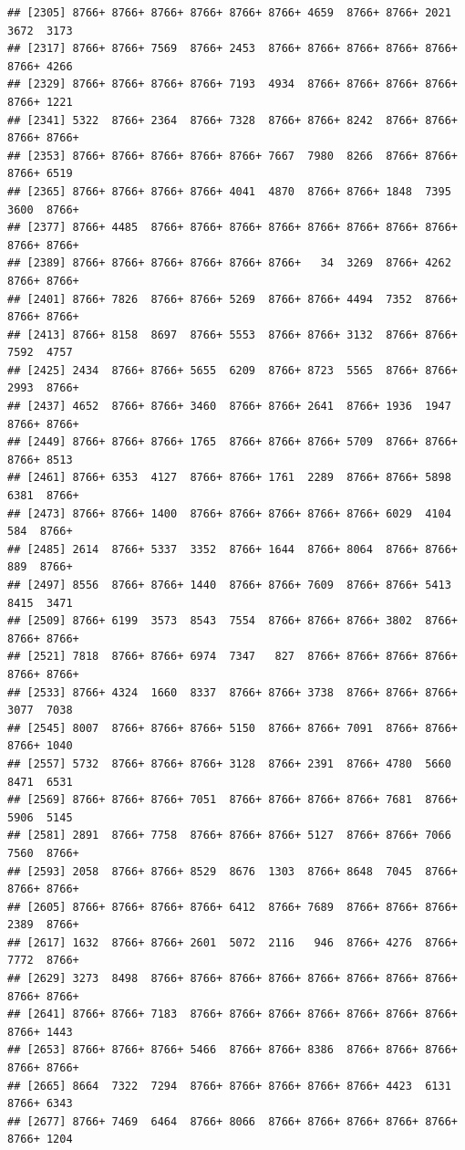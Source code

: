 \documentclass[
]{book}
\begin{document}
\begin{verbatim}
## [2305] 8766+ 8766+ 8766+ 8766+ 8766+ 8766+ 4659  8766+ 8766+ 2021  3672  3173 
## [2317] 8766+ 8766+ 7569  8766+ 2453  8766+ 8766+ 8766+ 8766+ 8766+ 8766+ 4266 
## [2329] 8766+ 8766+ 8766+ 8766+ 7193  4934  8766+ 8766+ 8766+ 8766+ 8766+ 1221 
## [2341] 5322  8766+ 2364  8766+ 7328  8766+ 8766+ 8242  8766+ 8766+ 8766+ 8766+
## [2353] 8766+ 8766+ 8766+ 8766+ 8766+ 7667  7980  8266  8766+ 8766+ 8766+ 6519 
## [2365] 8766+ 8766+ 8766+ 8766+ 4041  4870  8766+ 8766+ 1848  7395  3600  8766+
## [2377] 8766+ 4485  8766+ 8766+ 8766+ 8766+ 8766+ 8766+ 8766+ 8766+ 8766+ 8766+
## [2389] 8766+ 8766+ 8766+ 8766+ 8766+ 8766+   34  3269  8766+ 4262  8766+ 8766+
## [2401] 8766+ 7826  8766+ 8766+ 5269  8766+ 8766+ 4494  7352  8766+ 8766+ 8766+
## [2413] 8766+ 8158  8697  8766+ 5553  8766+ 8766+ 3132  8766+ 8766+ 7592  4757 
## [2425] 2434  8766+ 8766+ 5655  6209  8766+ 8723  5565  8766+ 8766+ 2993  8766+
## [2437] 4652  8766+ 8766+ 3460  8766+ 8766+ 2641  8766+ 1936  1947  8766+ 8766+
## [2449] 8766+ 8766+ 8766+ 1765  8766+ 8766+ 8766+ 5709  8766+ 8766+ 8766+ 8513 
## [2461] 8766+ 6353  4127  8766+ 8766+ 1761  2289  8766+ 8766+ 5898  6381  8766+
## [2473] 8766+ 8766+ 1400  8766+ 8766+ 8766+ 8766+ 8766+ 6029  4104   584  8766+
## [2485] 2614  8766+ 5337  3352  8766+ 1644  8766+ 8064  8766+ 8766+  889  8766+
## [2497] 8556  8766+ 8766+ 1440  8766+ 8766+ 7609  8766+ 8766+ 5413  8415  3471 
## [2509] 8766+ 6199  3573  8543  7554  8766+ 8766+ 8766+ 3802  8766+ 8766+ 8766+
## [2521] 7818  8766+ 8766+ 6974  7347   827  8766+ 8766+ 8766+ 8766+ 8766+ 8766+
## [2533] 8766+ 4324  1660  8337  8766+ 8766+ 3738  8766+ 8766+ 8766+ 3077  7038 
## [2545] 8007  8766+ 8766+ 8766+ 5150  8766+ 8766+ 7091  8766+ 8766+ 8766+ 1040 
## [2557] 5732  8766+ 8766+ 8766+ 3128  8766+ 2391  8766+ 4780  5660  8471  6531 
## [2569] 8766+ 8766+ 8766+ 7051  8766+ 8766+ 8766+ 8766+ 7681  8766+ 5906  5145 
## [2581] 2891  8766+ 7758  8766+ 8766+ 8766+ 5127  8766+ 8766+ 7066  7560  8766+
## [2593] 2058  8766+ 8766+ 8529  8676  1303  8766+ 8648  7045  8766+ 8766+ 8766+
## [2605] 8766+ 8766+ 8766+ 8766+ 6412  8766+ 7689  8766+ 8766+ 8766+ 2389  8766+
## [2617] 1632  8766+ 8766+ 2601  5072  2116   946  8766+ 4276  8766+ 7772  8766+
## [2629] 3273  8498  8766+ 8766+ 8766+ 8766+ 8766+ 8766+ 8766+ 8766+ 8766+ 8766+
## [2641] 8766+ 8766+ 7183  8766+ 8766+ 8766+ 8766+ 8766+ 8766+ 8766+ 8766+ 1443 
## [2653] 8766+ 8766+ 8766+ 5466  8766+ 8766+ 8386  8766+ 8766+ 8766+ 8766+ 8766+
## [2665] 8664  7322  7294  8766+ 8766+ 8766+ 8766+ 8766+ 4423  6131  8766+ 6343 
## [2677] 8766+ 7469  6464  8766+ 8066  8766+ 8766+ 8766+ 8766+ 8766+ 8766+ 1204 

\end{verbatim}
\end{document}
